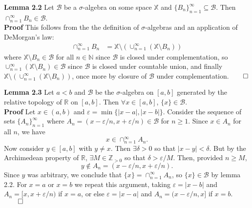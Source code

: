 \documentclass[11pt, letterpaper]{article}
\newcommand{\mbb}[1]{\mathbb{#1}}
\newcommand{\mc}[1]{\mathcal{#1}}
\begin{document}
    \begin{center}
        \begin{minipage}[c]{0.85\linewidth}
            {\bf Lemma 2.2} Let $\mc{B}$ be a $\sigma$-algebra on some space $\mbb{X}$ and $\{B_n\}_{n=1}^\infty\subseteq\mc{B}$. Then $\cap_{n=1}^\infty B_n\in\mc{B}$.\\[10pt]
            {\bf Proof} This follows from the the definition of $\sigma$-algebras and an application of DeMorgan's law:
            \begin{align*}
                \cap_{n=1}^\infty B_n&=\mbb{X}\setminus\left(\cup_{n=1}^\infty (\mbb{X}\setminus B_n)\right)
            \end{align*}
            where $\mbb{X}\setminus B_n\in\mc{B}$ for all $n\in\mbb{N}$ since $\mc{B}$ is closed under complementation, so $\cup_{n=1}^\infty(\mbb{X}\setminus B_n)\in\mc{B}$ since $\mc{B}$ is closed under countable union, and finally $\mbb{X}\setminus(\cup_{n=1}^\infty(\mbb{X}\setminus B_n))$,
            once more by closure of $\mc{B}$ under complementation.\hfill{$\qed$}
        \end{minipage}
    \end{center}\vspace{10pt}
    \begin{center}
        \begin{minipage}[c]{0.85\linewidth}
            {\bf Lemma 2.3} Let $a<b$ and $\mc{B}$ be the $\sigma$-algebra on $[a,b]$ generated by the relative topology of $\mbb{R}$ on $[a,b]$. Then $\forall x\in[a,b]$, $\{x\}\in\mc{B}$.\\[10pt]
            {\bf Proof} Let $x\in(a,b)$ and $\varepsilon=\min\{|x-a|,|x-b|\}$. Consider the sequence of sets $\{A_n\}_{n=1}^\infty$ where $A_n=(x-\varepsilon/n,x+\varepsilon/n)\in\mc{B}$ for $n\geq 1$. Since $x\in A_n$ for all $n$, we have
            \[x\in\cap_{n=1}^\infty A_n.\]
            Now consider $y\in[a,b]$ with $y\neq x$. Then $\exists\delta>0$ so that $|x-y|<\delta$. But by the Archimedean property of $\mbb{R}$, $\exists M\in\mbb{Z}_{>0}$ so that $\delta>\varepsilon/M$. Then, provided $n\geq M$, 
            \[y\notin A_n=(x-\varepsilon/n,x+\varepsilon/n).\]
            Since $y$ was arbitrary, we conclude that $\{x\}=\cap_{n=1}^\infty A_n$, so $\{x\}\in\mc{B}$ by lemma 2.2. For $x=a$ or $x=b$ we repeat this argument, taking $\varepsilon=|x-b|$ and $A_n=[x,x+\varepsilon/n)$ if $x=a$, or else $\varepsilon=|x-a|$ and $A_n=(x-\varepsilon/n,x]$ if $x=b$.\hfill{$\qed$}
        \end{minipage}
    \end{center}\vspace{10pt}
\end{document}
